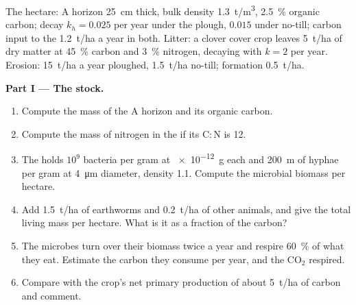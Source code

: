 \begin{problem}
\label{pb:b2:living-soil:1}
The hectare: A horizon \qty{25}{cm} thick, bulk density
\qty{1.3}{t/m^3}, \qty{2.5}{\%} organic carbon;  decay $k_h =
0.025$ per year under the plough, $0.015$ under no-till; carbon
input to the  \qty{1.2}{t/ha} a year in both. Litter: a
clover cover crop leaves \qty{5}{t/ha} of dry matter at
\qty{45}{\%} carbon and \qty{3}{\%} nitrogen, decaying with $k = 2$
per year. Erosion: \qty{15}{t/ha} a year ploughed, \qty{1.5}{t/ha}
no-till; formation \qty{0.5}{t/ha}.

\medskip
\noindent\textbf{Part I --- The stock.}
\begin{enumerate}
  \item Compute the mass of the A horizon and its organic carbon.
  \item Compute the mass of nitrogen in the  if its
        $\mathrm{C:N}$ is 12.
  \item The  holds $10^{9}$ bacteria per gram at \qty{e-12}{g}
        each and \qty{200}{m} of hyphae per gram at \qty{4}{\micro m}
        diameter, density 1.1. Compute the microbial biomass per
        hectare.
  \item Add \qty{1.5}{t/ha} of earthworms and \qty{0.2}{t/ha} of
        other animals, and give the total living mass per hectare.
        What is it as a fraction of the  carbon?
  \item The microbes turn over their biomass twice a year and
        respire \qty{60}{\%} of what they eat. Estimate the carbon
        they consume per year, and the $\mathrm{CO_2}$ respired.
  \item Compare with the crop's net primary production of about
        \qty{5}{t/ha} of carbon and comment.
\end{enumerate}


\end{problem}

